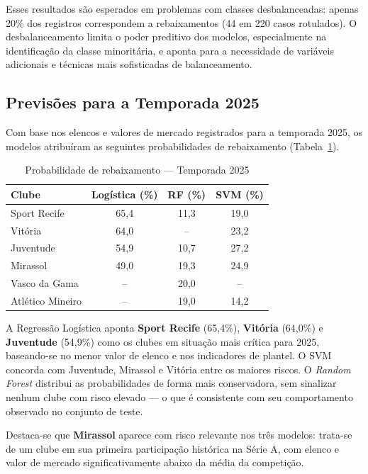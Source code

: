 Esses resultados são esperados em problemas com classes desbalanceadas:
apenas 20\% dos registros correspondem a rebaixamentos (44 em 220 casos rotulados).
O desbalanceamento limita o poder preditivo dos modelos, especialmente na identificação
da classe minoritária, e aponta para a necessidade de variáveis adicionais
e técnicas mais sofisticadas de balanceamento.

\subsection{Previsões para a Temporada 2025}

Com base nos elencos e valores de mercado registrados para a temporada 2025,
os modelos atribuíram as seguintes probabilidades de rebaixamento
(Tabela~\ref{tab:prev2025}).

\begin{table}[H]
\centering
\caption{Probabilidade de rebaixamento — Temporada 2025}
\label{tab:prev2025}
\begin{tabular}{lccc}
\toprule
\textbf{Clube} & \textbf{Logística (\%)} & \textbf{RF (\%)} & \textbf{SVM (\%)} \\
\midrule
Sport Recife        & 65,4 & 11,3 & 19,0 \\
Vitória             & 64,0 & --   & 23,2 \\
Juventude           & 54,9 & 10,7 & 27,2 \\
Mirassol            & 49,0 & 19,3 & 24,9 \\
Vasco da Gama       & --   & 20,0 & --   \\
Atlético Mineiro    & --   & 19,0 & 14,2 \\
\bottomrule
\end{tabular}
\end{table}

A Regressão Logística aponta \textbf{Sport Recife} (65,4\%), \textbf{Vitória} (64,0\%)
e \textbf{Juventude} (54,9\%) como os clubes em situação mais crítica para 2025,
baseando-se no menor valor de elenco e nos indicadores de plantel.
O SVM concorda com Juventude, Mirassol e Vitória entre os maiores riscos.
O \textit{Random Forest} distribui as probabilidades de forma mais conservadora,
sem sinalizar nenhum clube com risco elevado — o que é consistente com seu comportamento
observado no conjunto de teste.

Destaca-se que \textbf{Mirassol} aparece com risco relevante nos três modelos:
trata-se de um clube em sua primeira participação histórica na Série A,
com elenco e valor de mercado significativamente abaixo da média da competição.


